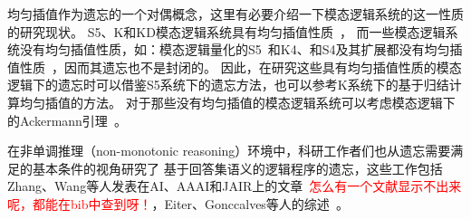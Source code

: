 均匀插值作为遗忘的一个对偶概念，这里有必要介绍一下模态逻辑系统的这一性质的研究现状。
S5、K和KD模态逻辑系统具有均匀插值性质~\cite{DBLP:journals/aml/Iemhoff19}，
而一些模态逻辑系统没有均匀插值性质，如：模态逻辑量化的S5~\cite{DBLP:journals/jsyml/Fine79}和K4、和S4及其扩展都没有均匀插值性质~\cite{DBLP:journals/ndjfl/Schumm86}，因而其遗忘也不是封闭的。
因此，在研究这些具有均匀插值性质的模态逻辑下的遗忘时可以借鉴S5系统下的遗忘方法，也可以参考K系统下的基于归结计算均匀插值的方法。
对于那些没有均匀插值的模态逻辑系统可以考虑模态逻辑下的Ackermann引理~\cite{DBLP:books/daglib/0023036}。



在非单调推理（non-monotonic reasoning）环境中，科研工作者们也从遗忘需要满足的基本条件的视角研究了
基于回答集语义的逻辑程序的遗忘，这些工作包括Zhang、Wang等人发表在AI、AAAI和JAIR上的文章~\cite{DBLP:Zhang:AIJ2006,DBLP:journals/ai/EiterW08,Wong:PhD:Thesis,DBLP:journals/jair/WangZZZ14,wang2013forgetting,DBLP:conf/aaai/WangWWZ15,DBLP:journals/jair/Delgrande17,gonccalves2020limits}\textcolor{red}{怎么有一个文献显示不出来呢，都能在bib中查到呀！}，Eiter、Gonccalves等人的综述~\cite{eiter2019brief,gonccalves2021forgetting}。


